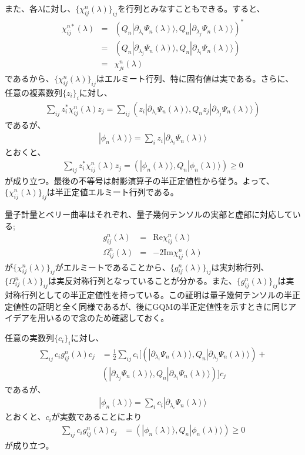 \documentclass[12pt]{jsbook}
\newcommand{\ra}{\rangle}
\newcommand{\pa}{\partial}
\begin{document}
また、各$\lambda$に対し、$\{\chi^{n}_{ij}(\lambda)\}_{ij}$を行列とみなすこともできる。すると、
\begin{eqnarray}
\chi^{n*}_{ij}(\lambda)&=&(Q_n|\pa_{\lambda_i}\Psi_n(\lambda)\ra,Q_n|\pa_{\lambda_j}\Psi_n(\lambda)\ra)^*\\
&=&(Q_n|\pa_{\lambda_j}\Psi_n(\lambda)\ra,Q_n|\pa_{\lambda_i}\Psi_n(\lambda)\ra)\\
&=&\chi^{n}_{ji}(\lambda)
\end{eqnarray}
であるから、$\{\chi^{n}_{ij}(\lambda)\}_{ij}$はエルミート行列、特に固有値は実である。さらに、任意の複素数列$\{z_i\}_i$に対し、
\begin{eqnarray}
\displaystyle \sum_{ij} z_i^{*}\chi^{n}_{ij}(\lambda)z_j=\displaystyle \sum_{ij} (z_i|\pa_{\lambda_i}\Psi_n(\lambda)\ra,Q_n z_j|\pa_{\lambda_j}\Psi_n(\lambda)\ra)
\end{eqnarray}
であるが、
\begin{eqnarray}
|\phi_n(\lambda)\ra = \displaystyle \sum_{i} z_i|\pa_{\lambda_i}\Psi_n(\lambda)\ra
\end{eqnarray}
とおくと、
\begin{eqnarray}
\label{SPDsingle}
\displaystyle \sum_{ij} z_i^{*}\chi^{n}_{ij}(\lambda)z_j=(|\phi_n(\lambda)\ra,Q_n|\phi_n(\lambda)\ra)\geq 0
\end{eqnarray}
が成り立つ。最後の不等号は射影演算子の半正定値性から従う。よって、$\{\chi^{n}_{ij}(\lambda)\}_{ij}$は半正定値エルミート行列である。

量子計量とベリー曲率はそれぞれ、量子幾何テンソルの実部と虚部に対応している;
\begin{eqnarray}
    g^{n}_{ij}(\lambda)&=&\mathrm{Re} \chi^{n}_{ij}(\lambda)\\
    \Omega^n_{ij}(\lambda)&=&-2\mathrm{Im}\chi^{n}_{ij}(\lambda)
\end{eqnarray}
が$\{\chi^{n}_{ij}(\lambda)\}_{ij}$がエルミートであることから、$\{g^{n}_{ij}(\lambda)\}_{ij}$は実対称行列、$\{\Omega^{n}_{ij}(\lambda)\}_{ij}$は実反対称行列となっていることが分かる。また、$\{g^{n}_{ij}(\lambda)\}_{ij}$は実対称行列としての半正定値性を持っている。この証明は量子幾何テンソルの半正定値性の証明と全く同様であるが、後にGQMの半正定値性を示すときに同じアイデアを用いるので念のため確認しておく。

任意の実数列$\{c_i\}_i$に対し、
\begin{eqnarray}
    \displaystyle \sum_{ij}c_i g^{n}_{ij}(\lambda)c_j &=\frac{1}{2}\displaystyle \sum_{ij} c_i \Big[(|\pa_{\lambda_i}\Psi_n(\lambda)\ra,Q_n|\pa_{\lambda_j}\Psi_n(\lambda)\ra)+\\
    &(|\pa_{\lambda_j}\Psi_n(\lambda)\ra,Q_n|\pa_{\lambda_i}\Psi_n(\lambda)\ra)]c_j
\end{eqnarray}
であるが、
\begin{eqnarray}
|\phi_n(\lambda)\ra = \displaystyle \sum_{i} c_i|\pa_{\lambda_i}\Psi_n(\lambda)\ra
\end{eqnarray}
とおくと、$c_i$が実数であることにより
\begin{eqnarray}
    \displaystyle \sum_{ij}c_i g^{n}_{ij}(\lambda)c_j &=(|\phi_n(\lambda)\ra,Q_n|\phi_n(\lambda)\ra)\geq 0
\end{eqnarray}
が成り立つ。
\end{document}
